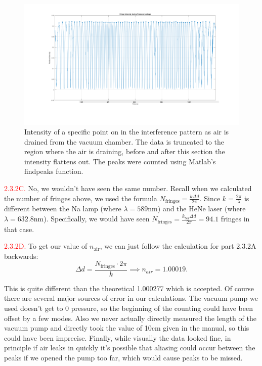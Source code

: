 \documentclass[letterpaper, reqno,11pt]{article}
\begin{document}
\begin{figure}[htpb]
    \centering
    \includegraphics[width=1.0\textwidth]{2B.png}
    \caption{Intensity of a specific point on in the interference pattern as air is drained from the vacuum chamber. The data is truncated to the region where the air is draining, before and after this section the intensity flattens out. The peaks were counted using Matlab's findpeaks function.}
    \label{fig:2B}
\end{figure}

\noindent \textcolor{red}{2.3.2C.} No, we wouldn't have seen the same number. Recall when we calculated the number of fringes above, we used the formula $N_{\text{fringes}}=\frac{k\Delta d}{2\pi}$. Since $k=\frac{2\pi}{\lambda}$ is different between the Na lamp (where $\lambda=589$nm) and the HeNe laser (where $\lambda=632.8$nm). Specifically, we would have seen $N_{\text{fringes}}=\frac{k_{\text{Na}}\Delta d}{2\pi}=94.1$ fringes in that case.

\noindent \textcolor{red}{2.3.2D.} To get our value of $n_{\text{air}}$, we can just follow the calculation for part 2.3.2A backwards:
\[
\Delta d= \frac{N_{\text{fringes}}\cdot 2\pi}{k}\implies n_{air}=1.00019
.\]

This is quite different than the theoretical 1.000277 which is accepted. Of course there are several major sources of error in our calculations. The vacuum pump we used doesn't get to 0 pressure, so the beginning of the counting could have been offset by a few modes. Also we never actually directly measured the length of the vacuum pump and directly took the value of 10cm given in the manual, so this could have been imprecise. Finally, while visually the data looked fine, in principle if air leaks in quickly it's possible that aliasing could occur between the peaks if we opened the pump too far, which would cause peaks to be missed.
\end{document}
